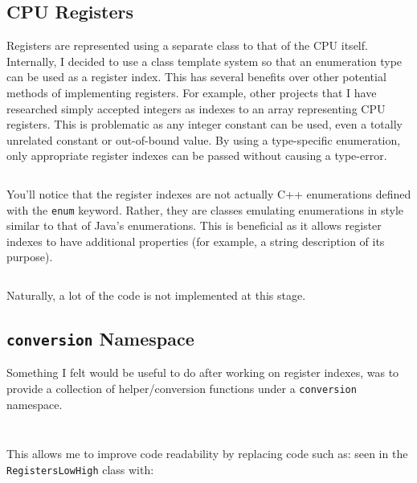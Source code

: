    \inputminted{cmake}{code/first_CMakeLists.txt}

\subsection{CPU Registers}
    Registers are represented using a separate class to that of the CPU itself. Internally, I decided to use a class template system so that an enumeration type can be used as a register index. This has several benefits over other potential methods of implementing registers. For example, other projects that I have researched simply accepted integers as indexes to an array representing CPU registers. This is problematic as any integer constant can be used, even a totally unrelated constant or out-of-bound value. By using a type-specific enumeration, only appropriate register indexes can be passed without causing a type-error.

    \inputminted{c++}{code/registerindexes.hpp}

    You'll notice that the register indexes are not actually C++ enumerations defined with the \texttt{enum} keyword. Rather, they are classes emulating enumerations in style similar to that of Java's enumerations. This is beneficial as it allows register indexes to have additional properties (for example, a string description of its purpose).

    \inputminted{c++}{code/registers.hpp}

    Naturally, a lot of the code is not implemented at this stage.

\subsection{\texttt{conversion} Namespace}
    Something I felt would be useful to do after working on register indexes, was to provide a collection of helper/conversion functions under a \texttt{conversion} namespace. 

    \inputminted{c++}{code/conversion.hpp}

    \inputminted{c++}{code/conversion.cpp}

    This allows me to improve code readability by replacing code such as:  seen in the \texttt{RegistersLowHigh} class with: 

